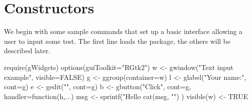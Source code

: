 






\section{Constructors}
\label{sec:constructors}

We begin with some sample  commands that set up a basic
interface allowing a user to input some test. The first line loads the
package, the others will be described later.

\begin{Schunk}
\begin{Sinput}
 require(gWidgets)
 options(guiToolkit="RGtk2")
 w <- gwindow("Text input example", visible=FALSE)
 g <- ggroup(container=w)
 l <- glabel("Your name:", cont=g)
 e <- gedit("", cont=g)
 b <- gbutton("Click", cont=g, handler=function(h,...) {
   msg <- sprintf("Hello %
   cat(msg, "\n")
 })
 visible(w) <- TRUE
\end{Sinput}
\end{Schunk}


